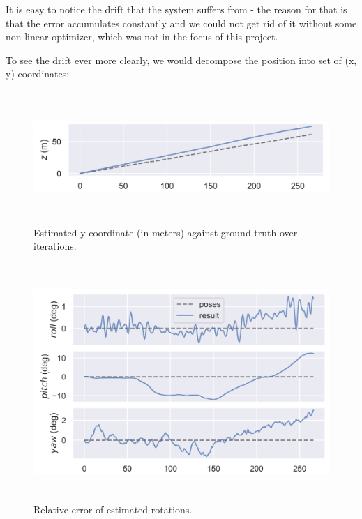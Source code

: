 It is easy to notice the drift that the system suffers from - the reason for that is that the error accumulates constantly and we could not get rid of it without some non-linear optimizer, which was not in the focus of this project.

To see the drift ever more clearly, we would decompose the position into set of (x, y) coordinates:

\begin{figure}[h]
\caption{Estimated y coordinate (in meters) against ground truth over iterations.}
\includegraphics[height=5cm, width=15cm]{results/y_coord_over_time.png}
\end{figure}

\begin{figure}[!htb]
\caption{Relative error of estimated rotations.}
\includegraphics[height=9cm, width=15cm]{results/rotation.png}
\end{figure}

